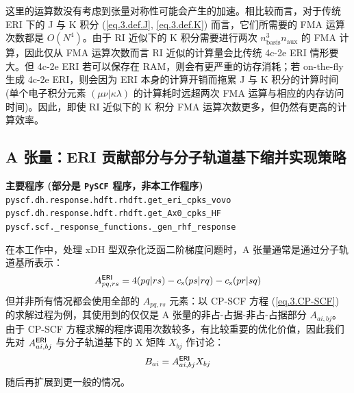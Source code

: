 这里的运算数没有考虑到张量对称性可能会产生的加速。相比较而言，对于传统 ERI 下的 J 与 K 积分 (\ref{eq.3.def.J}, \ref{eq.3.def.K}) 而言，它们所需要的 FMA 运算次数都是 $O(N^4)$。由于 RI 近似下的 K 积分需要进行两次 $n_\mathrm{basis}^3 n_\mathrm{aux}$ 的 FMA 计算，因此仅从 FMA 运算次数而言 RI 近似的计算量会比传统 4c-2e ERI 情形要大。但 4c-2e ERI 若可以保存在 RAM，则会有更严重的访存消耗；若 on-the-fly 生成 4c-2e ERI，则会因为 ERI 本身的计算开销而拖累 J 与 K 积分的计算时间 (单个电子积分元素 $(\mu \nu | \kappa \lambda)$ 的计算耗时远超两次 FMA 运算与相应的内存访问时间)。因此，即使 RI 近似下的 K 积分 FMA 运算次数更多，但仍然有更高的计算效率。

\subsection{A 张量：ERI 贡献部分与分子轨道基下缩并实现策略}
\label{sec.3.A-by-MO}

\begin{tcolorbox}
    \textbf{主要程序 (部分是 \texttt{PySCF} 程序，非本工作程序)}\\
    \verb|pyscf.dh.response.hdft.rhdft.get_eri_cpks_vovo|\\
    \verb|pyscf.dh.response.hdft.rhdft.get_Ax0_cpks_HF|\\
    \verb|pyscf.scf._response_functions._gen_rhf_response|
\end{tcolorbox}

在本工作中，处理 xDH 型双杂化泛函二阶梯度问题时，A 张量通常是通过分子轨道基所表示：
\begin{equation}
    \label{eq.3.A-tensor-RI-expansion}
    A_{pq, rs}^{\textsf{ERI}} = 4 (pq | rs) - c_{\textsf{x}} (ps | rq) - c_{\textsf{x}} (pr | sq)
\end{equation}
但并非所有情况都会使用全部的 $A_{pq, rs}$ 元素：以 CP-SCF 方程 (\ref{eq.3.CP-SCF}) 的求解过程为例，其使用到的仅仅是 A 张量的非占-占据-非占-占据部分 $A_{ai, bj}$。由于 CP-SCF 方程求解的程序调用次数较多，有比较重要的优化价值，因此我们先对 $A_{ai, bj}^{\textsf{ERI}}$ 与分子轨道基下的 X 矩阵 $X_{bj}$ 作讨论：
\begin{equation}
    \label{eq.3.A-contract-MO-directly}
    B_{ai} = A_{ai, bj}^{\textsf{ERI}} X_{bj}
\end{equation}
随后再扩展到更一般的情况。


